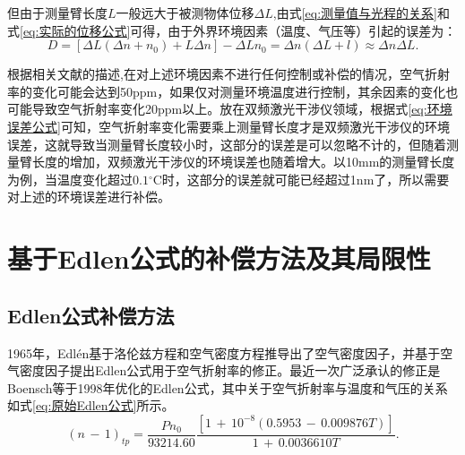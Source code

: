 但由于测量臂长度\(L\)一般远大于被测物体位移\(\Delta L\),由式\eqref{eq:测量值与光程的关系}和式\eqref{eq:实际的位移公式}可得，由于外界环境因素（温度、气压等）引起的误差为：
\begin{equation}\label{eq:环境误差公式}
    D=[\Delta L(\Delta n+n_0)+L\Delta n]-\Delta Ln_0=\Delta n(\Delta L+l) \approx \Delta n \Delta L.
\end{equation}

根据相关文献的描述\cite{徐建2013双频激光干涉仪系统线性测量误差主要来源及减小误差的方法分析},在对上述环境因素不进行任何控制或补偿的情况，空气折射率的变化可能会达到50ppm，如果仅对测量环境温度进行控制，其余因素的变化也可能导致空气折射率变化20ppm以上。放在双频激光干涉仪领域，根据式\eqref{eq:环境误差公式}可知，空气折射率变化需要乘上测量臂长度才是双频激光干涉仪的环境误差，这就导致当测量臂长度较小时，这部分的误差是可以忽略不计的，但随着测量臂长度的增加，双频激光干涉仪的环境误差也随着增大。以10mm的测量臂长度为例，当温度变化超过\(0.1\)$^{\circ}$C时，这部分的误差就可能已经超过1nm了，所以需要对上述的环境误差进行补偿。

\section{基于Edlen公式的补偿方法及其局限性}
\subsection{Edlen公式补偿方法}
1965年，Edlén基于洛伦兹方程和空气密度方程推导出了空气密度因子，并基于空气密度因子提出Edlen公式用于空气折射率的修正\cite{2015Refractive}。最近一次广泛承认的修正是Boensch等\cite{1998Fit}于1998年优化的Edlen公式，其中关于空气折射率与温度和气压的关系如式\eqref{eq:原始Edlen公式}所示。
    \begin{equation}\label{eq:原始Edlen公式}
    (n\,-\,1)_{tp}=\frac{Pn_0}{93214.60}\frac{[1\,+\,10^{-8}(0.5953\,-\,0.009876T)]}{1\,+\,0.0036610T}.
    \end{equation}

